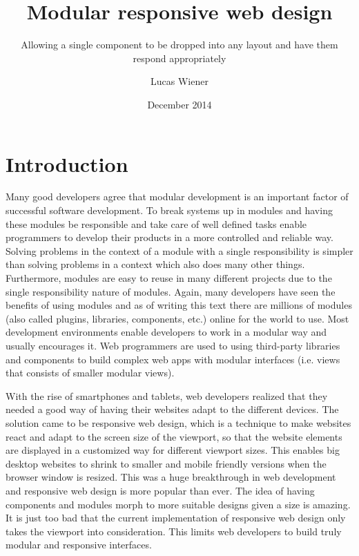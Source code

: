 \documentclass[oneside,a4paper,11pt]{kth-mag}
\title{Modular responsive web design}
\subtitle{Allowing a single component to be dropped into any layout and have them respond appropriately}
\author{Lucas Wiener}
\date{December 2014}
\begin{document}
\frontmatter
\pagestyle{empty}
\removepagenumbers
\maketitle
\mainmatter
\section*{Introduction}

Many good developers agree that modular development is an important factor of successful software development. To break systems up in modules and having these modules be responsible and take care of well defined tasks enable programmers to develop their products in a more controlled and reliable way. Solving problems in the context of a module with a single responsibility is simpler than solving problems in a context which also does many other things. Furthermore, modules are easy to reuse in many different projects due to the single responsibility nature of modules. Again, many developers have seen the benefits of using modules and as of writing this text there are millions of modules (also called plugins, libraries, components, etc.) online for the world to use. Most development environments enable developers to work in a modular way and usually encourages it. Web programmers are used to using third-party libraries and components to build complex web apps with modular interfaces (i.e. views that consists of smaller modular views).

With the rise of smartphones and tablets, web developers realized that they needed a good way of having their websites adapt to the different devices. The solution came to be responsive web design, which is a technique to make websites react and adapt to the screen size of the viewport, so that the website elements are displayed in a customized way for different viewport sizes. This enables big desktop websites to shrink to smaller and mobile friendly versions when the browser window is resized. This was a huge breakthrough in web development and responsive web design is more popular than ever. The idea of having components and modules morph to more suitable designs given a size is amazing. It is just too bad that the current implementation of responsive web design only takes the viewport into consideration. This limits web developers to build truly modular and responsive interfaces.
\end{document}
